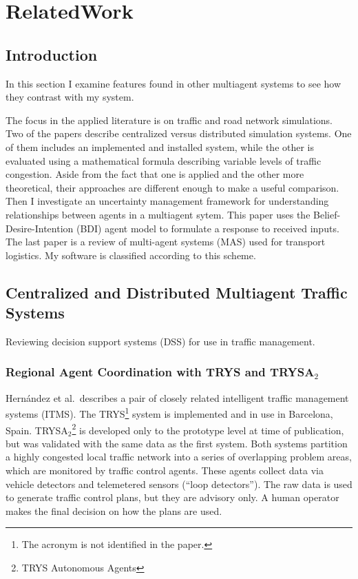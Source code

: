 \documentclass[11pt,letterpaper,onecolumn,twoside,openright,final]{report}
\begin{document}
%


\chapter{RelatedWork}
\section{Introduction}
In this section I examine features found in other multiagent systems to see how they contrast with my system.

The focus in the applied literature is on traffic and road network simulations.
Two of the papers describe centralized versus distributed simulation systems\cite{france2003mso,hernandez2001}.
One of them includes an implemented and installed system, while the other is evaluated using a mathematical formula describing variable levels of traffic congestion.
Aside from the fact that one is applied and the other more theoretical, their approaches are different enough to make a useful comparison.
Then I investigate an uncertainty management framework for understanding relationships between agents in a multiagent sytem\cite{wu2003umf}.
This paper uses the Belief-Desire-Intention (BDI) agent model to formulate a response to received inputs.
The last paper is a review of multi-agent systems (MAS) used for transport logistics\cite{davidsson2005aab}.
My software is classified according to this scheme.

\section[Multiagent Traffic Systems]{Centralized and Distributed Multiagent Traffic Systems}
Reviewing decision support systems (DSS) for use in traffic management.

\subsection{Regional Agent Coordination with TRYS and TRYSA$_{2}$}
Hern\'{a}ndez et al.\cite{hernandez2001}~describes a pair of closely related intelligent traffic management systems (ITMS).
The TRYS\footnote{The acronym is not identified in the paper.} system is implemented and in use in Barcelona, Spain.
TRYSA$_{2}$\footnote{TRYS Autonomous Agents} is developed only to the prototype level at time of publication, but was validated with the same data as the first system.
Both systems partition a highly congested local traffic network into a series of overlapping problem areas, which are monitored by traffic control agents.
These agents collect data via vehicle detectors and telemetered sensors (``loop detectors'').
The raw data is used to generate traffic control plans, but they are advisory only.
A human operator makes the final decision on how the plans are used.
\end{document}
